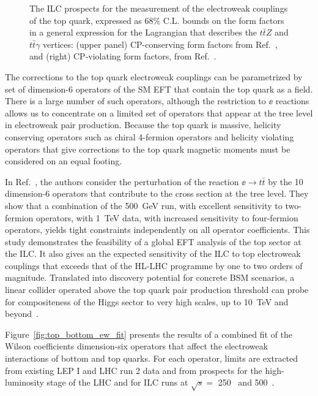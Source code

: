\begin{figure}[tb]
\begin{center}
\caption{The ILC prospects for the measurement of the electroweak couplings of the top quark, expressed as 68\% C.L. bounds on the form factors in a general expression 
for the Lagrangian that describes the $t\bar{t}Z$ and $t\bar{t}\gamma$ vertices:
(upper panel) CP-conserving form factors from Ref.~\cite{Abramowicz:2016zbo}, 
and (right) CP-violating form factors, from Ref.~\cite{Bernreuther:2017cyi}.
\label{fig:top_ew_couplings}}
 \end{center}
 \vspace{-0.7cm}
 \end{figure}
 

The corrections to the top quark electroweak couplings can 
be parametrized by set of 
dimension-6 operators of the SM EFT that contain the top quark as a
field. There is a large number of such operators, although the
restriction to $\ee$ reactions allows us to concentrate on a limited
set of operators that appear at the tree level in electroweak pair
production.
Because the top quark is massive, helicity conserving operators such
as chiral 4-fermion operators and helicity violating operators that
give corrections to the top quark magnetic moments must be considered
on an equal footing. 

In 
Ref.~\cite{Durieux:2018tev}, the authors consider the
perturbation of the reaction $\ee\to t\bar t$ by the 10 dimension-6
operators that contribute to the cross section at the tree level.
They show that a combination of
 the 500~GeV run, with excellent sensitivity to two-fermion operators,
with 1~TeV{} data, with increased sensitivity to four-fermion
operators, yields  tight constraints independently on 
all operator coefficients.  This study demonstrates the feasibility of a global EFT
analysis of the top sector at the ILC.  It also gives an the expected sensitivity 
of the ILC to top electroweak couplings that  exceeds that of the HL-LHC programme 
by one to two orders of magnitude. Translated into discovery potential for concrete 
BSM scenarios, a linear collider operated above the top quark pair production 
threshold can probe for compositeness of the Higgs sector to very high scales, up 
to 10~TeV and beyond~\cite{Durieux:2018ekg}. 

Figure~\ref{fig:top_bottom_ew_fit} presents the results of a combined fit of 
the Wilson coefficients dimension-six operators that affect the electroweak 
interactions of bottom and top quarks. 
For each operator, limits are extracted from existing LEP I and LHC run 2 data and 
from prospects for the high-luminosity stage of the LHC and for ILC runs at 
$\sqrt{s}=$ 250~\GeV{} and 500~\GeV.

